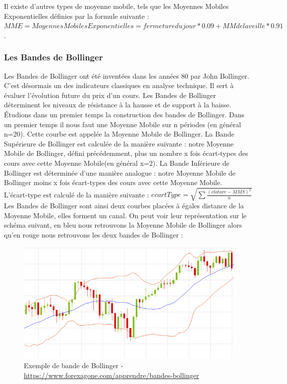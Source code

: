 Il existe d'autres types de moyenne mobile, tels que les Moyennes Mobiles Exponentielles définies par la formule suivante : \\
$MME = Moyennes Mobiles Exponentielles = fermeture du jour * 0.09 + MM de la veille * 0.91$. 


\subsubsection{Les Bandes de Bollinger}
Les Bandes de Bollinger ont été inventées dans les années 80 par John Bollinger. C'est désormais un des indicateurs classiques en analyse technique.  Il sert à évaluer l'évolution future du prix d'un cours. Les Bandes de Bollinger déterminent les niveaux de résistance à la hausse et de support à la baisse. \\

Étudions dans un premier temps la construction des bandes de Bollinger. Dans un premier temps il nous faut une Moyenne Mobile sur n périodes (en général n=20). Cette courbe est appelée la Moyenne Mobile de Bollinger. La Bande Supérieure de Bollinger est calculée de la manière suivante : notre Moyenne Mobile de Bollinger, défini précédemment, plus un nombre x fois écart-types des cours avec cette Moyenne Mobile(en général x=2). La Bande Inférieure de Bollinger est déterminée d'une manière analogue : notre Moyenne Mobile de Bollinger moins x fois écart-types des cours avec cette Moyenne Mobile. \\

L'écart-type est calculé de la manière suivante : $ecartType= \sqrt{\sum{\frac{(cloture-MMS)^2}{n}}} $ \\

Les Bandes de Bollinger sont ainsi deux courbes placées à égales distance de la Moyenne Mobile, elles forment un canal. On peut voir leur représentation sur le schéma suivant, en bleu nous retrouvons la Moyenne Mobile de Bollinger alors qu'en rouge nous retrouvons les deux bandes de Bollinger : 

\begin{figure}[H]
  \center
  \includegraphics[scale=0.5]{../graph/bollinger.png} 
  \caption{Exemple de bande de Bollinger - \url{https://www.forexagone.com/apprendre/bandes-bollinger}}
\end{figure} 

